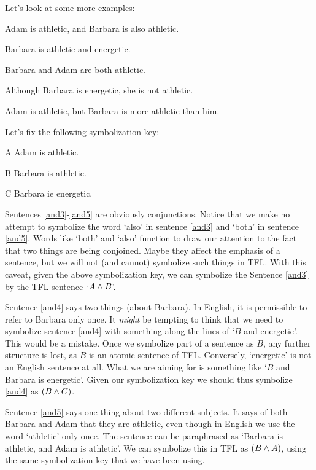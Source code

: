 Let's look at some more examples:
	\begin{earg}
	        \item[\ex{and3}]Adam is athletic, and Barbara is also athletic.
		\item[\ex{and4}]Barbara is athletic and energetic.
		\item[\ex{and5}]Barbara and Adam are both athletic.
		\item[\ex{and6}]Although Barbara is energetic, she is not athletic.
	\item[\ex{and7}]Adam is athletic, but Barbara is more athletic than him.
	\end{earg}

Let's fix the following symbolization key:
	\begin{ekey}
		\item[A] Adam is athletic.
		\item[B] Barbara is athletic.
		\item[C] Barbara ie energetic.
	\end{ekey}
Sentences \ref{and3}-\ref{and5} are obviously conjunctions. Notice that we make no attempt to symbolize the word `also' in sentence \ref{and3} and `both' in sentence \ref{and5}. Words like `both' and `also' function to draw our attention to the fact that two things are being conjoined. Maybe they affect the emphasis of a sentence, but we will not (and cannot) symbolize such things in TFL. With this caveat, given the above symbolization key, we can symbolize the Sentence \ref{and3} by the TFL-sentence `$A\mathbin{\wedge} B$'.

Sentence \ref{and4} says two things (about Barbara). In English, it is permissible to refer to Barbara only once. It \emph{might} be tempting to think that we need to symbolize sentence \ref{and4} with something along the lines of `$B$ and energetic'. This would be a mistake. Once we symbolize part of a sentence as $B$, any further structure is lost, as $B$ is an atomic sentence of TFL. Conversely, `energetic' is not an English sentence at all. What we are aiming for is something like `$B$ and Barbara is energetic'. Given our symbolization key we should thus symbolize \ref{and4} as $(B\mathbin{\wedge} C)$.

Sentence \ref{and5} says one thing about two different subjects. It says of both Barbara and Adam that they are athletic, even though in English we use the word `athletic' only once. The sentence can be paraphrased as `Barbara is athletic, and Adam is athletic'. We can symbolize this in TFL as $(B\mathbin{\wedge} A)$, using the same symbolization key that we have been using.

